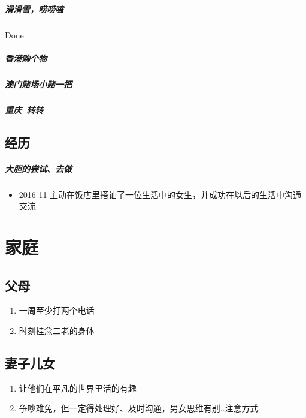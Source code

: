 \documentclass[UTF8,a4paper,8pt]{ctexbook}
\begin{document}
	    \paragraph{滑滑雪，唠唠嗑}Done
	    \paragraph{香港购个物}
	    \paragraph{澳门赌场小赌一把}
	    \paragraph{重庆\ 转转}
	    
    \section{经历}
	    \paragraph{大胆的尝试、去做}
		   \begin{itemize}
			   	\item 2016-11 主动在饭店里搭讪了一位生活中的女生，并成功在以后的生活中沟通交流
		   \end{itemize}

\chapter{家庭}    
    \section{父母}
	    \begin{enumerate}
	    	\item 一周至少打两个电话
	    	\item 时刻挂念二老的身体
	    \end{enumerate}
    
	\section{妻子儿女}
		\begin{enumerate}
			\item 让他们在平凡的世界里活的有趣
			\item 争吵难免，但一定得处理好、及时沟通，男女思维有别..注意方式
		\end{enumerate}
	
\end{document}
